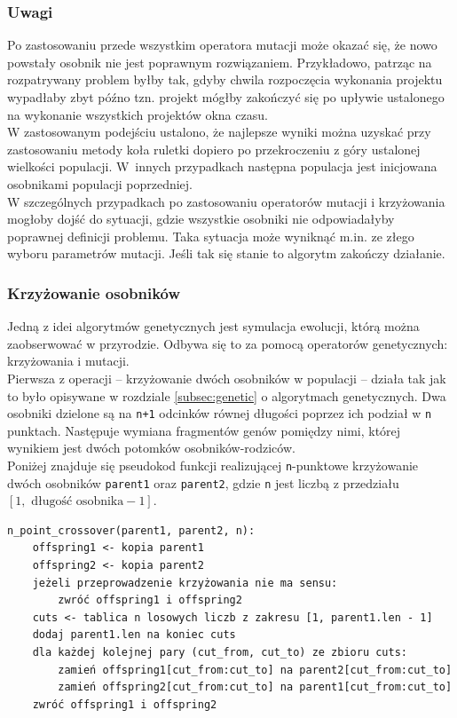 \documentclass[12pt,a4paper]{article}
\theoremstyle{definition}
\begin{document}
\subsubsection*{Uwagi}
Po zastosowaniu przede wszystkim operatora mutacji może okazać się, że nowo powstały osobnik nie jest poprawnym rozwiązaniem. Przykładowo, patrząc na rozpatrywany problem byłby tak, gdyby chwila rozpoczęcia wykonania projektu wypadłaby zbyt późno tzn. projekt mógłby zakończyć się po upływie ustalonego na wykonanie wszystkich projektów okna czasu. \\

\noindent 
W zastosowanym podejściu ustalono, że najlepsze wyniki można uzyskać przy zastosowaniu metody koła ruletki dopiero po przekroczeniu z góry ustalonej wielkości populacji. W~innych przypadkach następna populacja jest inicjowana osobnikami populacji poprzedniej. \\

\noindent
W szczególnych przypadkach po zastosowaniu operatorów mutacji i krzyżowania mogłoby dojść do sytuacji, gdzie wszystkie osobniki nie odpowiadałyby poprawnej definicji problemu. Taka sytuacja może wyniknąć m.in. ze złego wyboru parametrów mutacji. Jeśli tak się stanie to algorytm zakończy działanie.

\subsubsection{Krzyżowanie osobników}
Jedną z idei algorytmów genetycznych jest symulacja ewolucji, którą można zaobserwować w przyrodzie. Odbywa się to za pomocą operatorów genetycznych: krzyżowania i mutacji.\\

\noindent
Pierwsza z operacji -- krzyżowanie dwóch osobników w populacji -- działa tak jak to było opisywane w rozdziale \ref{subsec:genetic} o algorytmach genetycznych. Dwa osobniki dzielone są na \texttt{n+1} odcinków równej długości poprzez ich podział w \texttt{n} punktach. Następuje wymiana fragmentów genów pomiędzy nimi, której wynikiem jest dwóch potomków osobników-rodziców.\\

\noindent
Poniżej znajduje się pseudokod funkcji realizującej \texttt{n}-punktowe krzyżowanie dwóch osobników \texttt{parent1} oraz \texttt{parent2}, gdzie \texttt{n} jest liczbą z przedziału $[1, \text{ długość osobnika} - 1]$.\\

\begin{tcolorbox}[title=Krzyżowanie dwóch osobników]
\begin{verbatim}
n_point_crossover(parent1, parent2, n):
    offspring1 <- kopia parent1
    offspring2 <- kopia parent2
    jeżeli przeprowadzenie krzyżowania nie ma sensu:
        zwróć offspring1 i offspring2
    cuts <- tablica n losowych liczb z zakresu [1, parent1.len - 1]
    dodaj parent1.len na koniec cuts
    dla każdej kolejnej pary (cut_from, cut_to) ze zbioru cuts:
        zamień offspring1[cut_from:cut_to] na parent2[cut_from:cut_to]
        zamień offspring2[cut_from:cut_to] na parent1[cut_from:cut_to]
    zwróć offspring1 i offspring2
\end{verbatim}
\end{tcolorbox}
\end{document}
